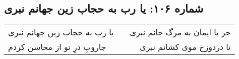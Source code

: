 \begin{center}
\section*{شماره ۱۰۶: یا رب به حجاب زین جهانم نبری}
\label{sec:106}
\begin{longtable}{l p{0.5cm} r}
یا رب به حجاب زین جهانم نبری
&&
جز با ایمان به مرگ جانم نبری
\\
جاروبِ درِ تو از محاسن کردم
&&
تا دردوزخ موی کشانم نبری
\\
\end{longtable}
\end{center}
